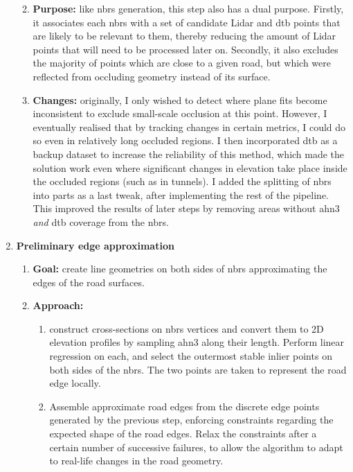 \begin{enumerate}
\begin{enumerate}
\begin{enumerate}
        \end{enumerate}
        \item \textbf{Purpose:} like \ac{nbrs} generation, this step also has a dual purpose. Firstly, it associates each \ac{nbrs} with a set of candidate Lidar and \ac{dtb} points that are likely to be relevant to them, thereby reducing the amount of Lidar points that will need to be processed later on. Secondly, it also excludes the majority of points which are close to a given road, but which were reflected from occluding geometry instead of its surface.
        \item \textbf{Changes:} originally, I only wished to detect where plane fits become inconsistent to exclude small-scale occlusion at this point. However, I eventually realised that by tracking changes in certain metrics, I could do so even in relatively long occluded regions. I then incorporated \ac{dtb} as a backup dataset to increase the reliability of this method, which made the solution work even where significant changes in elevation take place inside the occluded regions (such as in tunnels). I added the splitting of \ac{nbrs} into parts as a last tweak, after implementing the rest of the pipeline. This improved the results of later steps by removing areas without \ac{ahn3} \textit{and} \ac{dtb} coverage from the \ac{nbrs}.
    \end{enumerate}
    \item \textbf{Preliminary edge approximation}
    \begin{enumerate}
        \item \textbf{Goal:} create line geometries on both sides of \ac{nbrs} approximating the edges of the road surfaces.
        \item \textbf{Approach:}
        \begin{enumerate}
            \item construct cross-sections on \ac{nbrs} vertices and convert them to 2D elevation profiles by sampling \ac{ahn3} along their length. Perform linear regression on each, and select the outermost stable inlier points on both sides of the \ac{nbrs}. The two points are taken to represent the road edge locally.
            \item Assemble approximate road edges from the discrete edge points generated by the previous step, enforcing constraints regarding the expected shape of the road edges. Relax the constraints after a certain number of successive failures, to allow the algorithm to adapt to real-life changes in the road geometry.

\end{enumerate}
\end{enumerate}
\end{enumerate}
